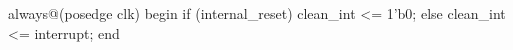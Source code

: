 \begin{vcode}
always@(posedge clk)
begin
    if (internal_reset)
        clean_int <= 1'b0;
    else
        clean_int <= interrupt;
end
\end{vcode}

